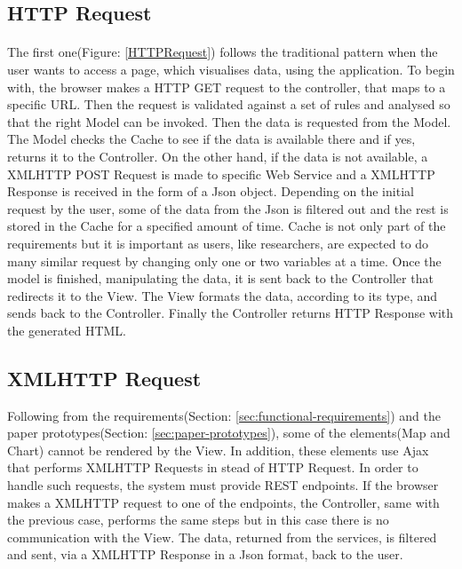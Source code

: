 \documentclass{l4proj}
\begin{document}
\subsection{HTTP Request}
\paragraph{}
The first one(Figure: \ref{HTTPRequest}) follows the traditional pattern when the user wants to access a page, which visualises data, using the application. To begin with, the browser makes a HTTP GET request to the controller, that maps to a specific URL. Then the request is validated against a set of rules and analysed so that the right Model can be invoked. Then the data is requested from the Model. The Model checks the Cache to see if the data is available there and if yes, returns it to the Controller. On the other hand, if the data is not available, a XMLHTTP POST Request is made to specific Web Service and a XMLHTTP Response is received in the form of a Json object. Depending on the initial request by the user, some of the data from the Json is filtered out and the rest is stored in the Cache for a specified amount of time. Cache is not only part of the requirements but it is important as users, like researchers, are expected to do many similar request by changing only one or two variables at a time. Once the model is finished, manipulating the data, it is sent back to the Controller that redirects it to the View. The View formats the data, according to its type, and sends back to the Controller. Finally the Controller returns HTTP Response with the generated HTML.  

\subsection{XMLHTTP Request}
Following from the requirements(Section: \ref{sec:functional-requirements}) and the paper prototypes(Section: \ref{sec:paper-prototypes}), some of the elements(Map and Chart) cannot be rendered by the View. In addition, these elements use Ajax that performs XMLHTTP Requests in stead of HTTP Request. In order to handle such requests, the system must provide REST endpoints. If the browser makes a XMLHTTP request to one of the endpoints, the Controller, same with the previous case, performs the same steps but in this case there is no communication with the View. The data, returned from the services, is filtered and sent, via a XMLHTTP Response in a Json format, back to the user. 
\end{document}
